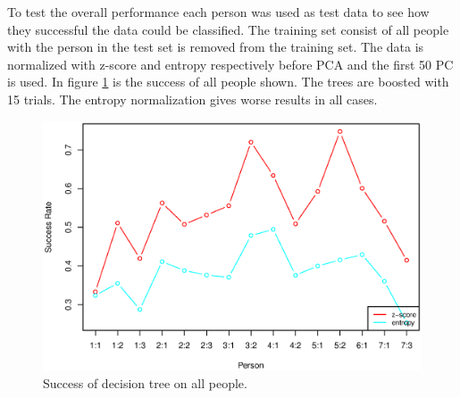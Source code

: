 To test the overall performance each person was used as test data to see how they successful the data could be classified.
The training set consist of all people with the person in the test set is removed from the training set. 
The data is normalized with z-score and entropy respectively before PCA and the first 50 PC is used. 
In figure \ref{fig:tree_success_all} is the success of all people shown.
The trees are boosted with 15 trials.
The entropy normalization gives worse results in all cases.

\begin{figure}[h]
\includegraphics[width = \textwidth]{graphics/tree_success_all}
\caption{Success of decision tree on all people.}
\label{fig:tree_success_all}
\end{figure}
